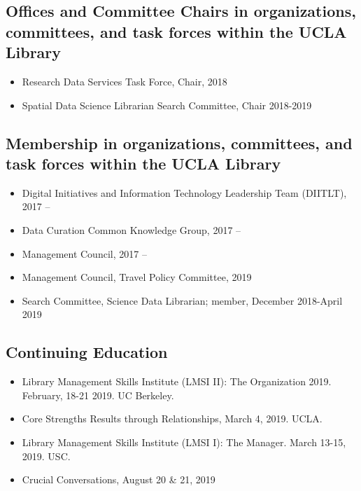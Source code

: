 
\subsection{Offices and Committee Chairs in organizations, committees, and task forces within the UCLA Library}

\begin{itemize}[label={}]
  \setlength\itemsep{-0.75em}
  \item Research Data Services Task Force, Chair, 2018
  \item Spatial Data Science Librarian Search Committee, Chair 2018-2019
\end{itemize}


\subsection{Membership in organizations, committees, and task forces within the UCLA Library}

\begin{itemize}[label={}]
    \item Digital Initiatives and Information Technology Leadership Team (DIITLT), 2017 --
    \item Data Curation Common Knowledge Group, 2017 -- 
    \item Management Council, 2017 --
    \item Management Council, Travel Policy Committee, 2019
    \item Search Committee, Science Data Librarian; member, December 2018-April 2019
\end{itemize}

\subsection{Continuing Education}


\begin{itemize}[label={}]
  \item Library Management Skills Institute (LMSI II): The Organization 2019. February, 18-21 2019. UC Berkeley.
  \item Core Strengths Results through Relationships, March 4, 2019. UCLA.
  \item Library Management Skills Institute (LMSI I): The Manager. March 13-15, 2019. USC.
  \item Crucial Conversations, August 20 & 21, 2019
\end{itemize}

